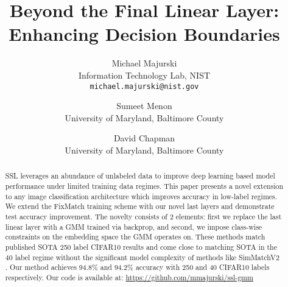 \documentclass[10pt,twocolumn,letterpaper]{article}
\begin{document}
\title{Beyond the Final Linear Layer: Enhancing Decision Boundaries}

\author{Michael Majurski\\
	Information Technology Lab, NIST\\
	{\tt\small michael.majurski@nist.gov}
\and
Sumeet Menon\\
University of Maryland, Baltimore County\\
\and
David Chapman\\
University of Maryland, Baltimore County\\
}
\maketitle








	
	
\maketitle


\begin{abstract}
SSL leverages an abundance of unlabeled data to improve deep learning based model performance under limited training data regimes.
This paper presents a novel extension to any image classification architecture which improves accuracy in low-label regimes. 
We extend the FixMatch \cite{sohn2020fixmatch} training scheme with our novel last layers and demonstrate test accuracy improvement. 
The novelty consists of 2 elements: first we replace the last linear layer with a GMM trained via backprop, and second, we impose class-wise constraints on the embedding space the GMM operates on.
These methods match published SOTA 250 label CIFAR10 \cite{cifar10} results and come close to matching SOTA in the 40 label regime without the significant model complexity of methods like SimMatchV2 \cite{zheng2023simmatchv2}.
Our method achieves 94.8\% and 94.2\% accuracy with 250 and 40 CIFAR10 labels respectively.
Our code is available at: \url{https://github.com/mmajurski/ssl-gmm}  %
\end{abstract}
\end{document}
